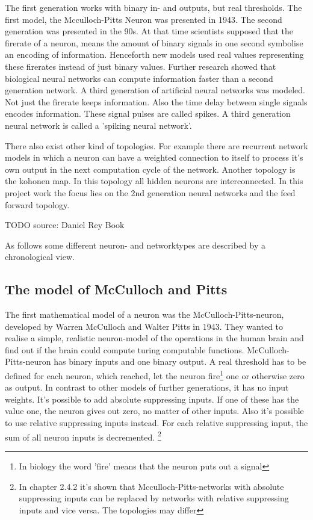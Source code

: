 \documentclass[10pt,a4paper,DIV=11]{scrreprt}
\begin{document}
The first generation works with binary in- and outputs, but real thresholds. The first model, the Mcculloch-Pitts Neuron was presented in 1943.
The second generation was presented in the 90s. At that time scientists supposed that the firerate of a neuron, means the amount of binary signals in one second symbolise an encoding of information. Henceforth new models used real values representing these firerates instead of just binary values.
Further research showed that biological neural networks can compute information faster than a second generation network.
A third generation of artificial neural networks was modeled. Not just the firerate keeps information. Also the time delay between single signals encodes information. These signal pulses are called spikes. A third generation neural network is called a 'spiking neural network'.
\cite{SNN}

There also exist other kind of topologies. For example there are recurrent network models in which a neuron can have a weighted connection to itself to process it's own output in the next computation cycle of the network. Another topology is the kohonen map. In this topology all hidden neurons are interconnected. In this project work the focus lies on the 2nd generation neural networks and the feed forward topology.



TODO source: Daniel Rey Book





As follows some different neuron- and networktypes are described by a chronological view.
\subsection{The model of McCulloch and Pitts}
\label{sec:pitts}
The first mathematical model of a neuron was the McCulloch-Pitts-neuron,
developed by Warren McCulloch and Walter Pitts in 1943.\cite{NEURONMATH}
They wanted to realise a simple, realistic neuron-model of the operations in the human brain and find out if the brain could compute turing computable functions.
McCulloch-Pitts-neuron has binary inputs and one binary output.
A real threshold has to be defined for each neuron, which reached, let the neuron fire\footnote{In biology the word 'fire' means that the neuron puts out a signal} one or otherwise zero as output.
In contrast to other models of further generations, it has no input weights.
It's possible to add absolute suppressing inputs. If one of these has the value one, the neuron gives out zero, no matter of other inputs.
Also it's possible to use relative suppressing inputs instead. For each relative suppressing input, the sum of all neuron inputs is decremented.
\footnote{In \cite{rojas} chapter 2.4.2 it's shown that Mcculloch-Pitts-networks with absolute suppressing inputs can be replaced by networks with relative suppressing inputs and vice versa. The topologies may differ}
\end{document}
